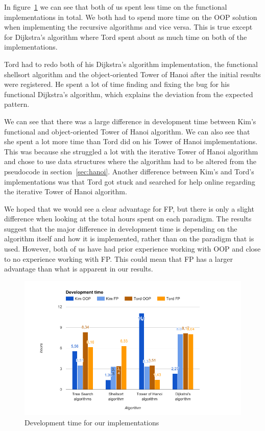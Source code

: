 \documentclass {article}
\begin{document}
In figure~\ref{fig:development-time-graph} we can see that both of us spent less time on the functional implementations in total. We both had to spend more time on the OOP solution when implementing the recursive algorithms and vice versa. This is true except for Dijkstra's algorithm where Tord spent about as much time on both of the implementations. 

Tord had to redo both of his Dijkstra's algorithm implementation, the functional shellsort algorithm and the object-oriented Tower of Hanoi after the initial results were registered. He spent a lot of time finding and fixing the bug for his functional Dijkstra's algorithm, which explains the deviation from the expected pattern.

We can see that there was a large difference in development time between Kim's functional and object-oriented Tower of Hanoi algorithm. We can also see that she spent a lot more time than Tord did on his Tower of Hanoi implementations. This was because she struggled a lot with the iterative Tower of Hanoi algorithm and chose to use data structures where the algorithm had to be altered from the pseudocode in section~\ref{sec:hanoi}. Another difference between Kim's and Tord's implementations was that Tord got stuck and searched for help online regarding the iterative Tower of Hanoi algorithm.

We hoped that we would see a clear advantage for FP, but there is only a slight difference when looking at the total hours spent on each paradigm. The results suggest that the major difference in development time is depending on the algorithm itself and how it is implemented, rather than on the paradigm that is used. However, both of us have had prior experience working with OOP and close to no experience working with FP. This could mean that FP has a larger advantage than what is apparent in our results. 

\begin{figure}[H]
\centering
\includegraphics[width=\textwidth]{development-time-graph}

\caption{Development time for our implementations}
\label{fig:development-time-graph}
\end{figure}
\end{document}
